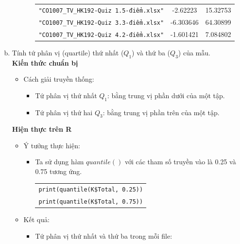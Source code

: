 \documentclass[a4paper]{article}
\theoremstyle{definition}
\begin{document}
\begin{enumerate}[a)]
\begin{itemize}
\begin{itemize}
\begin{center}
\begin{tabular}{l c c}
                     \texttt{"CO1007\_TV\_HK192-Quiz 1.5-điểm.xlsx"} & -2.62223 & 15.32753\\
                     \texttt{"CO1007\_TV\_HK192-Quiz 3.3-điểm.xlsx"} & -6.303646 & 64.30899\\
                     \texttt{"CO1007\_TV\_HK192-Quiz 4.2-điểm.xlsx"} & -1.601421 & 7.084802
                \end{tabular}
            \end{center}
        \end{itemize}
    \end{itemize}
    \bf\item Tính tứ phân vị (quartile) thứ nhất ($Q_1$) và thứ ba ($Q_3$) của mẫu.\\[6pt]
    \bf Kiến thức chuẩn bị\normalfont
    \begin{itemize}
        \item Cách giải truyền thống:
        \begin{itemize}
            \item Tứ phân vị thứ nhất $Q_1$: bằng trung vị phần dưới của một tập.
            \item Tứ phân vị thứ hai $Q_3$: bằng trung vị phần trên của một tập.
        \end{itemize}
    \end{itemize}
    \bf Hiện thực trên R\normalfont
    \begin{itemize}
        \item Ý tưởng thực hiện:
        \begin{itemize}
            \item Ta sử dụng hàm $quantile()$ với các tham số truyền vào là 0.25 và 0.75 tương ứng.
            \begin{center}
                \begin{tabular}{p{13cm}}
                    \texttt{print(quantile(K\$Total, 0.25))} \\
                    \texttt{print(quantile(K\$Total, 0.75))}
                \end{tabular}
            \end{center}
        \end{itemize}
        \item Kết quả:
        \begin{itemize}
            \item Tứ phân vị thứ nhất và thứ ba trong mỗi file:
            \begin{center}
                \begin{tabular}{l c c}

\end{tabular}
\end{center}
\end{itemize}
\end{itemize}
\end{enumerate}
\end{document}
